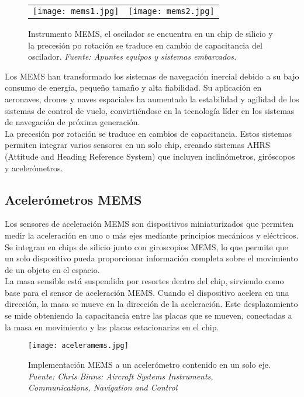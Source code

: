 \begin{figure}[H]
    \centering    
  \begin{tabular}{c c}  
        \texttt{[image: mems1.jpg]} & 
        \texttt{[image: mems2.jpg]} \\
    \end{tabular}

    \caption{\centering Instrumento MEMS, el oscilador se encuentra en un chip de silicio y la precesión po rotación se traduce en cambio de capacitancia del oscilador.\textit{ Fuente: Apuntes equipos y sistemas embarcados.}}
    \label{fig:colioris2}
\end{figure}

Los MEMS han transformado los sistemas de navegación inercial debido a su bajo consumo de energía, pequeño tamaño y alta fiabilidad. Su aplicación en aeronaves, drones y naves espaciales ha aumentado la estabilidad y agilidad de los sistemas de control de vuelo, convirtiéndose en la tecnología líder en los sistemas de navegación de próxima generación. \\

La precesión por rotación se traduce en cambios de capacitancia. Estos sistemas permiten integrar varios sensores en un solo chip, creando sistemas AHRS (Attitude and Heading Reference System)  que incluyen inclinómetros, giróscopos y acelerómetros.

\subsection{Acelerómetros MEMS}

Los sensores de aceleración MEMS son dispositivos miniaturizados que permiten medir la aceleración en uno o más ejes mediante principios mecánicos y eléctricos. Se integran en chips de silicio junto con giroscopios MEMS, lo que permite que un solo dispositivo pueda proporcionar información completa sobre el movimiento de un objeto en el espacio.\\

La masa sensible está suspendida por resortes dentro del chip, sirviendo como base para el sensor de aceleración MEMS. Cuando el dispositivo acelera en una dirección, la masa se mueve en la dirección de la aceleración. Este desplazamiento se mide obteniendo la capacitancia entre las placas que se mueven, conectadas a la masa en movimiento y las placas estacionarias en el chip.

\begin{figure}[H]
    \centering
    \texttt{[image: aceleramems.jpg]}
    \caption{\centering Implementación MEMS a un acelerómetro contenido en un solo eje.\textit{ Fuente: Chris Binns: Aircraft Systems Instruments, Communications, Navigation and Control}}
    \label{fig:mems12}
\end{figure}

